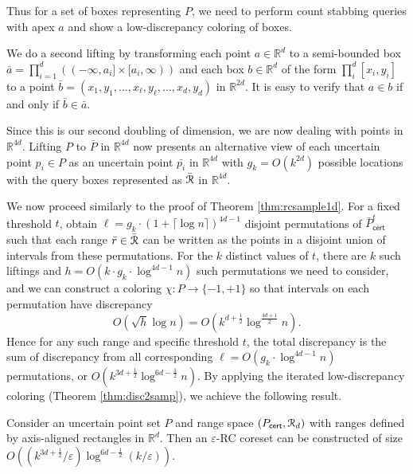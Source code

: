 \documentclass[11pt]{myclass}
\newcommand{\eps}{\varepsilon}
\newcommand{\Eu}[1]{\ensuremath{\EuScript{#1}}}
\newcommand{\bl}[1]{\ensuremath{\mathbb{#1}}}
\newcommand{\cert}{\textsf{cert}}
\newcommand{\RC}{\textsf{RC}\xspace}
\begin{document}
Thus for a set of boxes representing $P$, we need to perform count stabbing queries with apex $a$ and show a low-discrepancy coloring of boxes.  

We do a second lifting by transforming each point $a \in \bl{R}^d$ to a semi-bounded box $\bar{a} = \prod_{i=1}^d ((-\infty, a_i] \times [a_i, \infty))$ and each box $b \in \bl{R}^d$  of the form $ \prod_i^d [x_i, y_i]$ to a point $\bar{b} = (x_1, y_1, ..., x_{\ell}, y_{\ell}, ..., x_d, y_d)$ in $\bl{R}^{2d}$. It is easy to verify that $a \in b$ if and only if $\bar{b} \in \bar{a}$.

 
Since this is our second doubling of dimension, we are now dealing with points in $\bl{R}^{4d}$. Lifting $P$ to $\bar{P}$ in $\bl{R}^{4d}$ now presents an alternative view of each uncertain point $p_i \in P $ as an uncertain point $\bar{p_i}$ in $\bl{R}^{4d}$ with $g_k = O(k^{2d})$ possible locations with the query boxes represented as $\bar{\Eu{R}}$ in $\bl{R}^{4d}$.

 We now proceed similarly to the proof of Theorem \ref{thm:rcsample1d}. For a fixed threshold $t$, obtain $\ell = g_k \cdot (1+\lceil \log n \rceil)^{4d-1}$ disjoint permutations of $\bar{P}_\cert^t$ such that each range $\bar{r} \in \bar{\Eu{R}}$ can be written as the points in a disjoint union of intervals from these permutations. 
 For the $k$ distinct values of $t$, there are $k$ such liftings and $h = O \left(k \cdot g_k \cdot \log^{4d-1} n \right)$ such permutations we need to consider, and we can construct a coloring $\chi : P \to \{-1,+1\}$ so that intervals on each permutation have discrepancy \[O(\sqrt{h} \log n) = O(k^{d+\frac{1}{2}} \log^{\frac{4d+1}{2}} n ).\] 
  Hence for any such range and specific threshold $t$, the total discrepancy is the sum of discrepancy from all corresponding $\ell = O \left( g_k \cdot \log^{4d-1} n \right)$ permutations, or $O \left(k^{3d +\frac{1}{2}} \log^{6d - \frac{1}{2}} n \right)$.  
By applying the iterated low-discrepancy coloring (Theorem \ref{thm:disc2samp}), we achieve the following result.

\begin{theorem}
\label{thm:RC-Rd}
Consider an uncertain point set $P$ and range space $(P_\cert, \Eu{R}_d)$ with ranges defined by axis-aligned rectangles in $\bl{R}^d$. 
Then an $\eps$-\RC coreset can be constructed of size $O \left((k^{3d +\frac{1}{2}}/\eps) \log^{6d - \frac{1}{2}} (k/\eps) \right)$.
\end{theorem}
\end{document}
